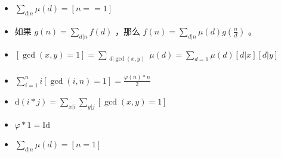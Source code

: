 \begin{itemize}
    \item $\sum_{d|n}\mu(d) = [n==1]$
    \item 如果 $g(n)=\sum_{d|n}f(d)$ ，那么 $f(n)=\sum_{d|n}\mu(d)g(\frac{n}{d})$ 。
    \item $[\gcd(x,y)=1] =\sum_{\begin{array}{c}d|\gcd(x,y)\\\end{array}}\mu(d) =\sum_{d=1}\mu(d)[d|x][d|y]$
    \item $\sum_{i=1}^ni[\gcd(i,n)=1]=\frac{\varphi(n)*n}2$
    \item $\mathrm{d}(i*j)=\sum_{x|i}\sum_{y|j}[\gcd(x,y)=1]$
    \item $\varphi*1=\mathrm{Id}$
    \item $\sum_{d|n}\mu(d)=[n=1]$
\end{itemize}
